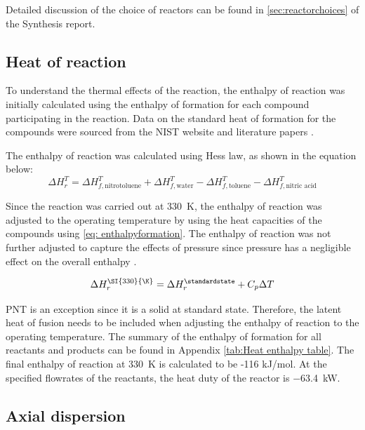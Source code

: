 Detailed discussion of the choice of reactors can be found in \cref{sec:reactorchoices} of the Synthesis report.

\subsection{Heat of reaction}
To understand the thermal effects of the reaction, the enthalpy of reaction was initially calculated using the enthalpy of formation for each compound participating in the reaction. Data on the standard heat of formation for the compounds were sourced from the NIST website and literature papers \cite{bikelyte_benchmark_2017, cox_codata_1984, di_miceli_raimondi_safety_2015, lenchitz_thermodynamic_1971, garner_heats_1921}.

The enthalpy of reaction was calculated using Hess law, as shown in the equation below:
\begin{equation}
\label{eq: enthalpyformation}
    \Delta H_{r}^{T} = \Delta H_{f,\mathrm{nitrotoluene}}^{T} + \Delta H_{f,\mathrm{water}}^{T} - \Delta H_{f,\mathrm{toluene}}^{T} - \Delta H_{f,\text{nitric acid}}^{T}
\end{equation}

Since the reaction was carried out at \SI{330}{\K}, the enthalpy of reaction was adjusted to the operating temperature by using the heat capacities of the compounds using \cref{eq: enthalpyformation}. The enthalpy of reaction was not further adjusted to capture the effects of pressure since pressure has a negligible effect on the overall enthalpy \cite{liu_nitration_2019}. 

\begin{equation}
    \Delta H_{r}^{\SI{330}{\K}} = \Delta H_{r}^{\standardstate} + C_p \Delta T
\end{equation}

PNT is an exception since it is a solid at standard state. Therefore, the latent heat of fusion needs to be included when adjusting the enthalpy of reaction to the operating temperature. The summary of the enthalpy of formation for all reactants and products can be found in Appendix \ref{tab:Heat enthalpy table}. The final enthalpy of reaction at \SI{330}{\K} is calculated to be -116 kJ/mol. At the specified flowrates of the reactants, the heat duty of the reactor is \SI{-63.4}{\kW}.

\subsection{Axial dispersion}
\label{sec:axialdispersion}

